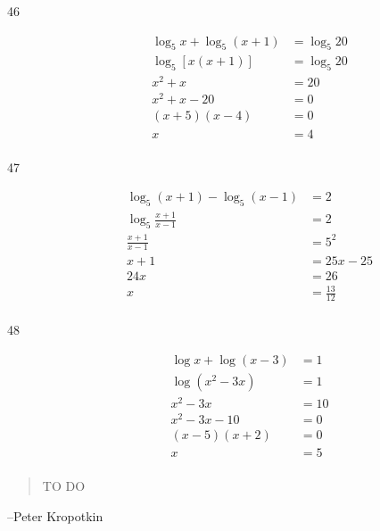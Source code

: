\documentclass{exam}
\begin{document}
\begin{description}
      \item[46] 
        \begin{align*}
          \log_5 x + \log_5(x + 1) &= \log_5 20 \\
          \log_5 [x(x + 1)]        &= \log_5 20 \\
          x^2 + x                  &= 20 \\
          x^2 + x - 20             &= 0 \\
          (x + 5)(x - 4)           &= 0 \\
          x                        &= \boxed{4} \\
        \end{align*}

      \item[47] 
        \begin{align*}
          \log_5 (x + 1) - \log_5 (x - 1) &= 2 \\
          \log_5 \frac{x + 1}{x - 1}      &= 2 \\
          \frac{x + 1}{x - 1}             &= 5^2 \\
          x + 1                           &= 25x - 25 \\
          24x                             &= 26 \\
          x                               &= \boxed{\frac{13}{12}} \\
        \end{align*}

      \item[48] 
        \begin{align*}
          \log x + \log (x - 3)        &= 1 \\
          \log \left( x^2 - 3x \right) &= 1 \\
          x^2 - 3x                     &= 10 \\
          x^2 - 3x - 10                &= 0 \\
          (x - 5)(x + 2)               &= 0 \\
          x                            &= \boxed{5} \\
        \end{align*}

    \end{description}

  \else
    \vspace{5 cm}
    \begin{quote}
      \begin{em}
        TO DO
      \end{em}
    \end{quote}

    \hspace{1 cm} --Peter Kropotkin
  \fi
\end{document}
